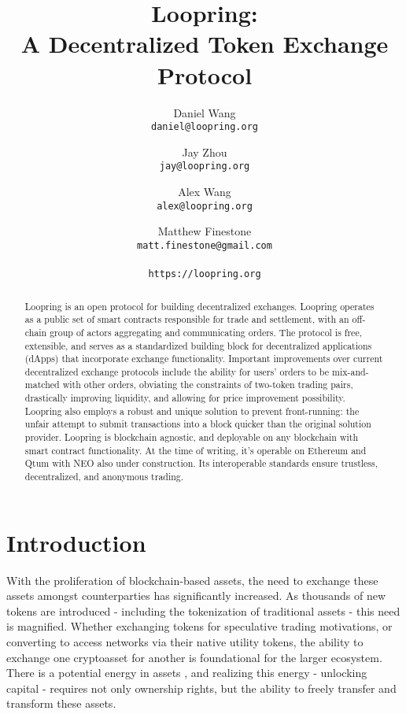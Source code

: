 \documentclass[UTF8,nofonts]{article}
\title{\textbf{Loopring:}\\\textbf{A Decentralized Token Exchange Protocol}}
\author{
  Daniel Wang\\
  \texttt{daniel@loopring.org}\\
  \and
  	Jay Zhou\\
  	\texttt{jay@loopring.org}\\
  	\and
  	Alex Wang\\
  	\texttt{alex@loopring.org}\\
  	\and
  	Matthew Finestone\\
  	\texttt{matt.finestone@gmail.com}\\ 
  \\
  \texttt{https://loopring.org}
 }
\begin{document}
\maketitle


\begin{abstract}
Loopring is an open protocol for building decentralized exchanges. Loopring operates as a public set of smart contracts responsible for trade and settlement, with an off-chain group of actors aggregating and communicating orders. The protocol is free, extensible, and serves as a standardized building block for decentralized applications (dApps) that incorporate exchange functionality. Important improvements over current decentralized exchange protocols include the ability for users' orders to be mix-and-matched with other orders, obviating the constraints of two-token trading pairs, drastically improving liquidity, and allowing for price improvement possibility. Loopring also employs a robust and unique solution to prevent front-running: the unfair attempt to submit transactions into a block quicker than the original solution provider. Loopring is blockchain agnostic, and deployable on any blockchain with smart contract functionality. At the time of writing, it's operable on Ethereum \cite{buterin2017ethereum} \cite{wood2014ethereum} and Qtum \cite{dai2017smart} with NEO \cite{atterlonn2018distributed} also under construction. Its interoperable standards ensure trustless, decentralized, and anonymous trading. 
\end{abstract}




\section{Introduction\label{sec:introduction}}

With the proliferation of blockchain-based assets, the need to exchange these assets amongst counterparties has significantly increased. As thousands of new tokens are introduced - including the tokenization of traditional assets - this need is magnified. Whether exchanging tokens for speculative trading motivations, or converting to access networks via their native utility tokens, the ability to exchange one cryptoasset for another is foundational for the larger ecosystem. There is a potential energy in assets \cite{desotocapital}, and realizing this energy - unlocking capital - requires not only ownership rights, but the ability to freely transfer and transform these assets.
 
\end{document}
